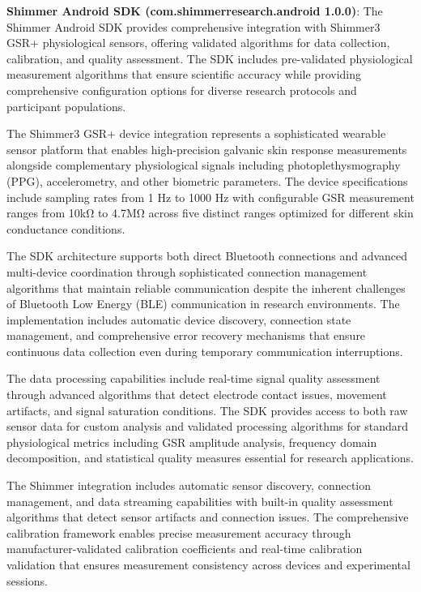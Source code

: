 \documentclass[11pt,a4paper]{article}
\begin{document}
\textbf{Shimmer Android SDK (com.shimmerresearch.android 1.0.0)}: The Shimmer Android SDK provides comprehensive integration
with Shimmer3 GSR+ physiological sensors, offering validated algorithms for data collection, calibration, and quality
assessment. The SDK includes pre-validated physiological measurement algorithms that ensure scientific accuracy while
providing comprehensive configuration options for diverse research protocols and participant populations.

The Shimmer3 GSR+ device integration represents a sophisticated wearable sensor platform that enables high-precision
galvanic skin response measurements alongside complementary physiological signals including photoplethysmography (PPG),
accelerometry, and other biometric parameters. The device specifications include sampling rates from 1 Hz to 1000 Hz
with configurable GSR measurement ranges from 10kΩ to 4.7MΩ across five distinct ranges optimized for different skin
conductance conditions.

The SDK architecture supports both direct Bluetooth connections and advanced multi-device coordination through
sophisticated connection management algorithms that maintain reliable communication despite the inherent challenges of
Bluetooth Low Energy (BLE) communication in research environments. The implementation includes automatic device
discovery, connection state management, and comprehensive error recovery mechanisms that ensure continuous data
collection even during temporary communication interruptions.

The data processing capabilities include real-time signal quality assessment through advanced algorithms that detect
electrode contact issues, movement artifacts, and signal saturation conditions. The SDK provides access to both raw
sensor data for custom analysis and validated processing algorithms for standard physiological metrics including GSR
amplitude analysis, frequency domain decomposition, and statistical quality measures essential for research
applications.

The Shimmer integration includes automatic sensor discovery, connection management, and data streaming capabilities with
built-in quality assessment algorithms that detect sensor artifacts and connection issues. The comprehensive calibration
framework enables precise measurement accuracy through manufacturer-validated calibration coefficients and real-time
calibration validation that ensures measurement consistency across devices and experimental sessions.
\end{document}

